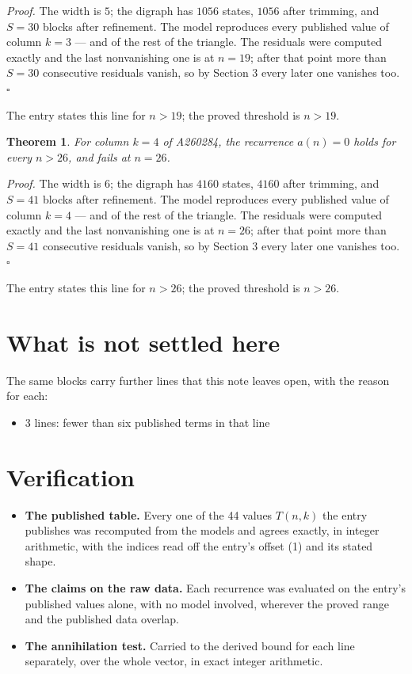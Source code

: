 \documentclass[11pt]{article}
\newtheorem{theorem}{Theorem}
\theoremstyle{definition}
\begin{document}
{\itshape Proof.} The width is $5$; the digraph has $1056$ states, $1056$ after trimming, and $S = 30$ blocks after refinement. The model reproduces every published value of column $k = 3$ --- and of the rest of the triangle. The residuals were computed exactly and the last nonvanishing one is at $n = 19$; after that point more than $S = 30$ consecutive residuals vanish, so by Section 3 every later one vanishes too. $\square$

The entry states this line for $n > 19$; the proved threshold is $n > 19$.

\begin{theorem} For column $k = 4$ of A260284, the recurrence $a(n) = 0$ holds for every $n > 26$, and fails at $n = 26$.\end{theorem}

{\itshape Proof.} The width is $6$; the digraph has $4160$ states, $4160$ after trimming, and $S = 41$ blocks after refinement. The model reproduces every published value of column $k = 4$ --- and of the rest of the triangle. The residuals were computed exactly and the last nonvanishing one is at $n = 26$; after that point more than $S = 41$ consecutive residuals vanish, so by Section 3 every later one vanishes too. $\square$

The entry states this line for $n > 26$; the proved threshold is $n > 26$.

\section{What is not settled here}

The same blocks carry further lines that this note leaves open, with the reason for each:

\begin{itemize}

\item 3 lines: fewer than six published terms in that line

\end{itemize}

\section{Verification}

\begin{itemize}

\item {\bfseries The published table.} Every one of the 44 values $T(n,k)$ the entry publishes was recomputed from the models and agrees exactly, in integer arithmetic, with the indices read off the entry's offset (1) and its stated shape.

\item {\bfseries The claims on the raw data.} Each recurrence was evaluated on the entry's published values alone, with no model involved, wherever the proved range and the published data overlap.

\item {\bfseries The annihilation test.} Carried to the derived bound for each line separately, over the whole vector, in exact integer arithmetic.

\end{itemize}
\end{document}
